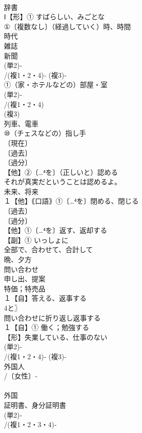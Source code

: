 \documentclass[8pt]{extreport}
\begin{document}
\begin{CJK}{UTF8}{min}
\\	辞書 
\\	Ⅰ【形】① すばらしい、みごとな
\\	①〔複数なし〕（経過していく）時、時間
\\	時代
\\	雑誌 
\\	新聞 
\\	(単2)‐
\\	/(複1・2・4)‐ (複3)‐
\\	①（家・ホテルなどの）部屋・室
\\	(単2)‐
\\	/(複1・2・4)
\\	(複3)
\\	列車、電車
\\	⑩（チェスなどの）指し手
\\	〔現在〕
\\	〔過去〕
\\	〔過分〕
\\	【他】②〔…⁴を〕（正しいと）認める 
\\	それが真実だということは認めるよ。
\\	未来、将来
\\	１【他】｟口語｠①〔…⁴を〕閉める、閉じる
\\	〔過去〕
\\	〔過分〕
\\	【他】①〔…⁴を〕返す、返却する
\\	【副】① いっしょに 
\\	全部で、合わせて、合計して 
\\	晩、夕方 
\\	問い合わせ
\\	申し出、提案
\\	特価；特売品 
\\	１【自】答える、返事する 
\\	4と〗
\\	問い合わせに折り返し返事する
\\	１【自】① 働く；勉強する
\\	【形】失業している、仕事のない
\\	(単2)‐
\\	/(複1・2・4)‐ (複3)‐
\\	外国人
\\	/〔女性〕‐
\\	[派生] 
\\	外国
\\	証明書、身分証明書
\\	(単2)‐
\\	/(複1・2・3・4)‐

\end{CJK}
\end{document}
